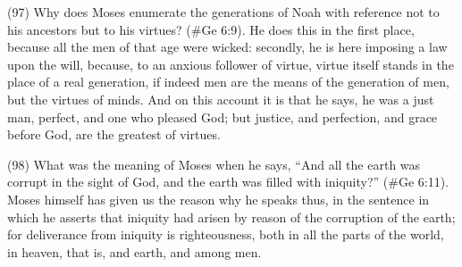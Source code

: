 (97) Why does Moses enumerate the generations of Noah with reference not to his ancestors but
to his virtues? (\#Ge 6:9). He does this in the first place, because all the men of that age were
wicked: secondly, he is here imposing a law upon the will, because, to an anxious follower of virtue,
virtue itself stands in the place of a real generation, if indeed men are the means of the generation
of men, but the virtues of minds. And on this account it is that he says, he was a just man, perfect,
and one who pleased God; but justice, and perfection, and grace before God, are the greatest of
virtues.

(98) What was the meaning of Moses when he says, ``And all the earth was corrupt in the sight of
God, and the earth was filled with iniquity?'' (\#Ge 6:11). Moses himself has given us the
reason why he speaks thus, in the sentence in which he asserts that iniquity had arisen by reason
of the corruption of the earth; for deliverance from iniquity is righteousness, both in all the parts of
the world, in heaven, that is, and earth, and among men.

